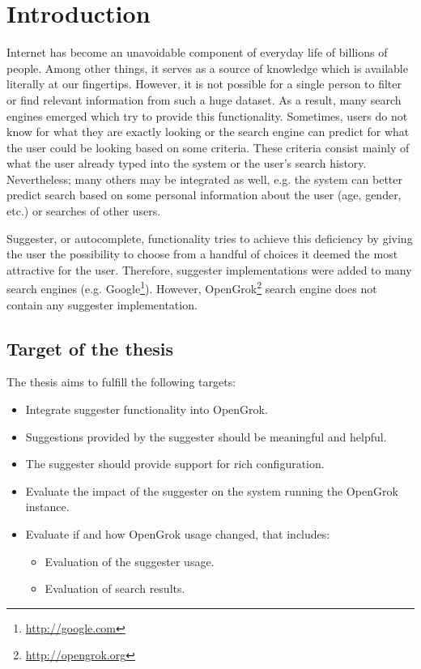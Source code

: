 \chapter*{Introduction}

Internet has become an unavoidable component of everyday life of billions of people. Among other things, it serves as a
source of knowledge which is available literally at our fingertips. However, it is not possible for a single person to
filter or find relevant information from such a huge dataset. As a result, many search engines emerged which try to
provide this functionality. Sometimes, users do not know for what they are exactly looking or the search engine can
predict for what the user could be looking based on some criteria. These criteria consist mainly of what the user
already typed into the system or the user's search history. Nevertheless; many others may be integrated as well, e.g.
the system can better predict search based on some personal information about the user (age, gender, etc.) or
searches of other users.


Suggester, or autocomplete, functionality tries to achieve this deficiency by giving the user the possibility to choose
from a handful of choices it deemed the most attractive for the user. Therefore, suggester implementations were added to
many search engines (e.g. Google\footnote{\url{http://google.com}}). However, OpenGrok\footnote{\url{http://opengrok.org}}
search engine does not contain any suggester implementation.

\section{Target of the thesis}

The thesis aims to fulfill the following targets:
\begin{itemize}
    \item Integrate suggester functionality into OpenGrok.
    \item Suggestions provided by the suggester should be meaningful and helpful.
    \item The suggester should provide support for rich configuration.
    \item Evaluate the impact of the suggester on the system running the OpenGrok instance.
    \item Evaluate if and how OpenGrok usage changed, that includes:
    \begin{itemize}
        \item Evaluation of the suggester usage.
        \item Evaluation of search results.
    \end{itemize}
\end{itemize}

